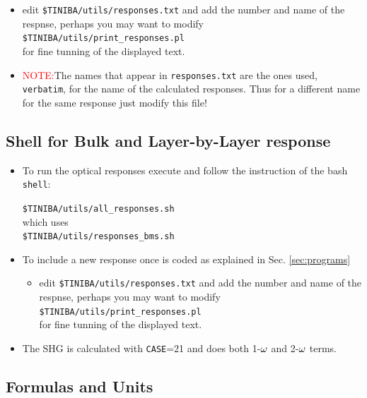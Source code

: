 \documentclass[openany,oneside]{book}
\numberwithin{equation}{section}
\begin{document}
\begin{itemize}
\begin{itemize}
\begin{itemize}
\item edit
\verb=$TINIBA/utils/responses.txt=  
and add the
 number and name of the respnse, perhaps you may want to modify\\
\verb=$TINIBA/utils/print_responses.pl=\\ for fine tunning
of the displayed text. 
\item\textcolor{red}{NOTE:}The names that appear in
  \verb=responses.txt= are the ones used, \verb=verbatim=, for the name
  of the calculated responses. Thus for a different name for the same
  response just modify this file!
\end{itemize}
\end{itemize}

\end{itemize}


\subsection{Shell for Bulk and Layer-by-Layer response}

\begin{itemize}

\item To run the optical responses execute and follow the instruction of the bash \verb=shell=:

  \verb=$TINIBA/utils/all_responses.sh=\\
which uses\\
\verb=$TINIBA/utils/responses_bms.sh=

\item To include a new response once is coded as explained in
 Sec. \ref{sec:programs} 

\begin{itemize}
\item edit
\verb=$TINIBA/utils/responses.txt=  
and add the
 number and name of the respnse, perhaps you may want to modify\\
\verb=$TINIBA/utils/print_responses.pl=\\ for fine tunning
of the displayed text.
\end{itemize}
\item The SHG is calculated with \verb=CASE==21 and does both 1-$\omega$
  and 2-$\omega$ terms.
\end{itemize}

\subsection{Formulas and Units}
\end{document}
